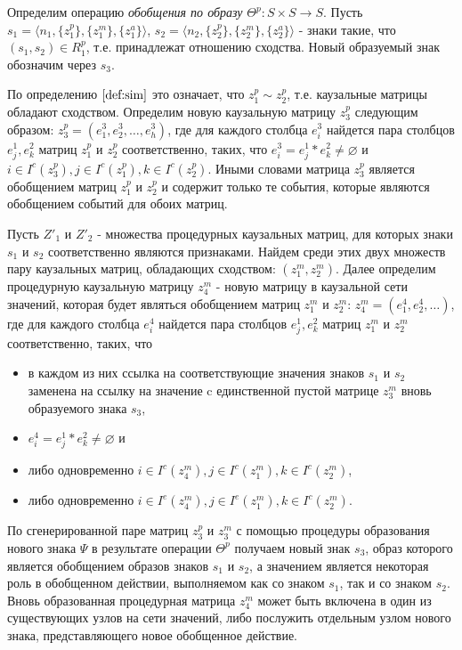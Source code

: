 \documentclass[12pt]{scrartcl}
\begin{document}
	Определим операцию \textit{обобщения по образу} $\Theta^p: S\times S\rightarrow S$. Пусть $s_1=\langle n_1, \{z_1^p\}, \{z_1^m\}, \{z_1^a\} \rangle$, $s_2=\langle n_2, \{z_2^p\}, \{z_2^m\}, \{z_2^a\} \rangle$ - знаки такие, что $(s_1,s_2)\in R_1^p$, т.е. принадлежат отношению сходства. Новый образуемый знак обозначим через $s_3$. 
	
	По определению $\autoref{def:sim}$ это означает, что $z_1^p\sim z_2^p$, т.е. каузальные матрицы обладают сходством. Определим новую каузальную матрицу $z_3^p$ следующим образом: $z_3^p=(e_1^3,e_2^3,\dots,e_h^3)$, где для каждого столбца $e_i^3$ найдется пара столбцов $e_j^1, e_k^2$ матриц $z_1^p$ и $z_2^p$ соответственно, таких, что $e_i^3=e_j^1*e_k^2\not=\varnothing$ и $i\in I^c(z_3^p), j\in I^c(z_1^p), k\in I^c(z_2^p)$. Иными словами матрица $z_3^p$ является обобщением матриц $z_1^p$ и $z_2^p$ и содержит только те события, которые являются обобщением событий для обоих матриц.
	
	Пусть $Z'_1$ и $Z'_2$ - множества процедурных каузальных матриц, для которых знаки $s_1$ и $s_2$ соответственно являются признаками. Найдем среди этих двух множеств пару каузальных матриц, обладающих сходством: $(z_1^m,z_2^m)$. Далее определим процедурную каузальную матрицу $z_4^m$ - новую матрицу в каузальной сети значений, которая будет являться обобщением матриц $z_1^m$ и $z_2^m$: $z_4^m=(e_1^4,e_2^4,\dots)$, где для каждого столбца $e_i^4$ найдется пара столбцов $e_j^1, e_k^2$ матриц $z_1^m$ и $z_2^m$ соответственно, таких, что
	\begin{itemize}
		\item в каждом из них ссылка на соответствующие значения знаков $s_1$ и $s_2$ заменена на ссылку на значение c единственной пустой матрице $z_3^m$ вновь образуемого знака $s_3$,
		\item $e_i^4=e_j^1*e_k^2\not=\varnothing$ и 
		\item либо одновременно $i\in I^c(z_4^m), j\in I^c(z_1^m), k\in I^c(z_2^m)$, 
		\item либо одновременно $i\in I^e(z_4^m), j\in I^e(z_1^m), k\in I^c(z_2^m)$.
	\end{itemize}
	
	По сгенерированной паре матриц $z_3^p$ и $z_3^m$ с помощью процедуры образования нового знака $\Psi$ в результате операции $\Theta^p$ получаем новый знак $s_3$, образ которого является обобщением образов знаков $s_1$ и $s_2$, а значением является некоторая роль в обобщенном действии, выполняемом как со знаком $s_1$, так и со знаком $s_2$. Вновь образованная процедурная матрица $z_4^m$ может быть включена в один из существующих узлов на сети значений, либо послужить отдельным узлом нового знака, представляющего новое обобщенное действие.
	
\end{document}
